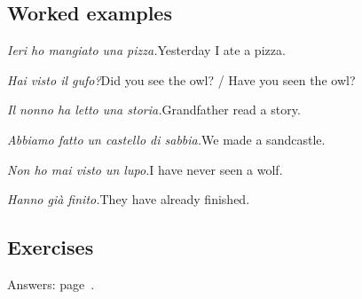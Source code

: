 \documentclass[11pt,a4paper,twoside,openright]{book}
\begin{document}
\subsection*{Worked examples}
\begin{examples}
\item\relax \textit{Ieri ho mangiato una pizza.}\newline Yesterday I ate a pizza.
\item\relax \textit{Hai visto il gufo?}\newline Did you see the owl? / Have you seen the owl?
\item\relax \textit{Il nonno ha letto una storia.}\newline Grandfather read a story.
\item\relax \textit{Abbiamo fatto un castello di sabbia.}\newline We made a sandcastle.
\item\relax \textit{Non ho mai visto un lupo.}\newline I have never seen a wolf.
\item\relax \textit{Hanno già finito.}\newline They have already finished.
\end{examples}

\subsection*{Exercises}\label{les:passato-prossimo-avere:exercises}
{\color{muted}\small Answers: page~\pageref{ans:passato-prossimo-avere}.}
\end{document}

